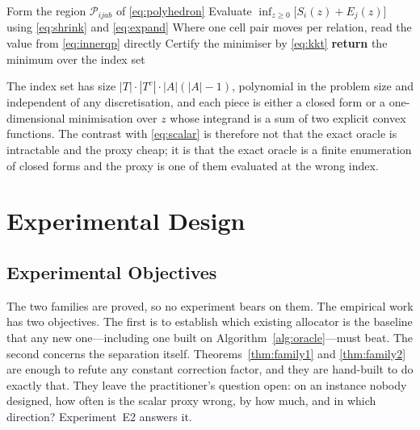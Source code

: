 \documentclass[conference]{IEEEtran}
\theoremstyle{definition}
\begin{document}
\begin{algorithm}[htbp]
\caption{Exact certification energy}
\label{alg:oracle}
\begin{algorithmic}[1]
  \STATE Form the region $\mathcal{P}_{ijab}$ of \eqref{eq:polyhedron}
  \STATE Evaluate $\inf_{z\ge0}\bigl[S_{i}(z)+E_{j}(z)\bigr]$ using
         \eqref{eq:shrink} and \eqref{eq:expand}
  \STATE Where one cell pair moves per relation, read the value from
         \eqref{eq:innerqp} directly
  \STATE Certify the minimiser by \eqref{eq:kkt} 
\ENDFOR
\STATE \textbf{return} the minimum over the index set
\end{algorithmic}
\end{algorithm}

The index set has size $|T|\cdot|T^{c}|\cdot|A|(|A|-1)$, polynomial in the problem size and
independent of any discretisation, and each piece is either a closed form or a
one-dimensional minimisation over $z$ whose integrand is a sum of two explicit convex
functions. The contrast with \eqref{eq:scalar} is therefore not that the exact oracle is
intractable and the proxy cheap; it is that the exact oracle is a finite enumeration of
closed forms and the proxy is one of them evaluated at the wrong index.

\section{Experimental Design}
\label{sec:expdesign}

\subsection{Experimental Objectives}

The two families are proved, so no experiment bears on them. The empirical work has two
objectives. The first is to establish which existing allocator is the baseline that any new
one---including one built on Algorithm~\ref{alg:oracle}---must beat. The second concerns the
separation itself. Theorems~\ref{thm:family1} and \ref{thm:family2} are enough to refute any
constant correction factor, and they are hand-built to do exactly that. They leave the
practitioner's question open: on an instance nobody designed, how often is the scalar proxy
wrong, by how much, and in which direction? Experiment~E2 answers it.
\end{document}

